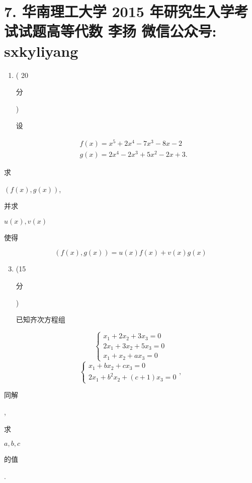 \documentclass[10pt]{article}
\begin{document}
\section{7. 华南理工大学 2015 年研究生入学考试试题高等代数 
 李扬 
 微信公众号: sxkyliyang}
\begin{enumerate}
  \item ( 20 \begin{CJK}{UTF8}{mj}分\end{CJK}) \begin{CJK}{UTF8}{mj}设\end{CJK}
\end{enumerate}
$$
\begin{aligned}
&f(x)=x^{5}+2 x^{4}-7 x^{3}-8 x-2 \\
&g(x)=2 x^{4}-2 x^{3}+5 x^{2}-2 x+3 .
\end{aligned}
$$
\begin{CJK}{UTF8}{mj}求\end{CJK} $(f(x), g(x))$, \begin{CJK}{UTF8}{mj}并求\end{CJK} $u(x), v(x)$ \begin{CJK}{UTF8}{mj}使得\end{CJK}
$$
(f(x), g(x))=u(x) f(x)+v(x) g(x)
$$

\begin{enumerate}
  \setcounter{enumi}{2}
  \item (15 \begin{CJK}{UTF8}{mj}分\end{CJK}) \begin{CJK}{UTF8}{mj}已知齐次方程组\end{CJK}
\end{enumerate}
$$
\left\{\begin{array}{l}
x_{1}+2 x_{2}+3 x_{3}=0 \\
2 x_{1}+3 x_{2}+5 x_{3}=0 \\
x_{1}+x_{2}+a x_{3}=0
\end{array}\right.
$$
$$
\left\{\begin{array}{l}
x_{1}+b x_{2}+c x_{3}=0 \\
2 x_{1}+b^{2} x_{2}+(c+1) x_{3}=0
\end{array},\right.
$$
\begin{CJK}{UTF8}{mj}同解\end{CJK}, \begin{CJK}{UTF8}{mj}求\end{CJK} $a, b, c$ \begin{CJK}{UTF8}{mj}的值\end{CJK}.
\end{document}
